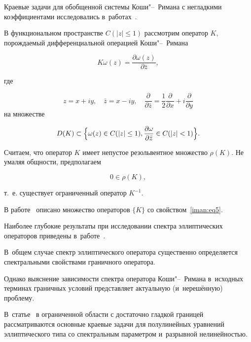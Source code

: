 Краевые задачи для обобщенной системы Коши"--~Римана с негладкими коэффициентами исследовались в~работах~\cite{iman:bib9,iman:bib10}.



В функциональном пространстве $ C(|z| \le 1) $ рассмотрим оператор $K$, порождаемый дифференциальной операцией Коши"--~Римана

\begin{equation}

\label{iman:eq4}

K\omega (z) = \frac{\partial \omega (z)}{\partial \bar z},

\end{equation}

где   

$$z = x + iy,\quad  \bar z = x - iy,\quad  \frac{\partial}{\partial \bar z} = \frac12 \frac{\partial}{\partial x} + i \frac{\partial}{\partial y} $$ на множестве

$$

 D(K) \subset \Bigl\{ \omega (z) \in C(|z| \le 1),\frac{\partial \omega }{\partial \bar z} \in C(|z| < 1) \Bigr\}.

$$

Считаем, что оператор $K$ имеет непустое резольвентное множество $\rho (K)$. Не умаляя общности, предполагаем 

\begin{equation}

\label{iman:eq5}

0 \in \rho (K),

\end{equation}

т.~е. существует ограниченный оператор $K^{ - 1}$. 

В работе~\cite{iman:bib5} описано множество операторов $\{ K \}$ со свойством~\eqref{iman:eq5}.



Наиболее глубокие результаты при исследовании спектра эллиптических операторов приведены в~работе~\cite{iman:bib11}. 

В~общем случае спектр эллиптического оператора существенно определяется спектральными свойствами граничного оператора. 

Однако выяснение зависимости спектра оператора Коши"--~Римана в~исходных терминах граничных условий представляет актуальную (и~нерешённую) проблему. 

В~статье~\cite{iman:bib12} в ограниченной области с достаточно гладкой границей рассматриваются основные краевые задачи для полулинейных уравнений эллиптического типа со спектральным параметром и~разрывной нелинейностью. 


